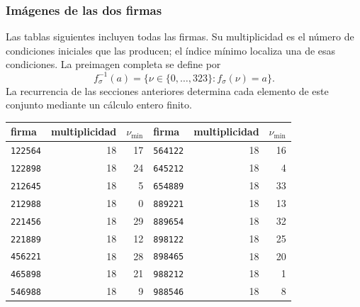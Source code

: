 \subsubsection{Imágenes de las dos firmas}

Las tablas siguientes incluyen todas las firmas. Su multiplicidad es el
número de condiciones iniciales que las producen; el índice mínimo localiza
una de esas condiciones. La preimagen completa se define por
\[
 f_\sigma^{-1}(a)=\{\nu\in\{0,\ldots,323\}:f_\sigma(\nu)=a\}.
\]
La recurrencia de las secciones anteriores determina cada elemento de este
conjunto mediante un cálculo entero finito.

\begin{tablacompleta}[htbp]
\caption{Las dieciocho firmas aditivas.}
\label{tpk:firmas-aditivas}
\begin{tabular}{@{}lrr@{\qquad}lrr@{}}
\toprule
firma&multiplicidad&\(\nu_{\min}\)&firma&multiplicidad&\(\nu_{\min}\)\\
\midrule
\texttt{122564}&18&17&\texttt{564122}&18&16\\
\texttt{122898}&18&24&\texttt{645212}&18&4\\
\texttt{212645}&18&5&\texttt{654889}&18&33\\
\texttt{212988}&18&0&\texttt{889221}&18&13\\
\texttt{221456}&18&29&\texttt{889654}&18&32\\
\texttt{221889}&18&12&\texttt{898122}&18&25\\
\texttt{456221}&18&28&\texttt{898465}&18&20\\
\texttt{465898}&18&21&\texttt{988212}&18&1\\
\texttt{546988}&18&9&\texttt{988546}&18&8\\
\bottomrule
\end{tabular}
\end{tablacompleta}

